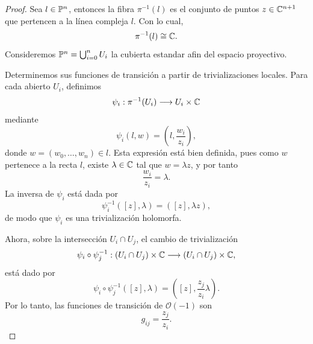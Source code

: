 	\begin{proof}
		Sea $l\in\mathbb{P}^n$, entonces la fibra $\pi^{-1}(l)$ es el conjunto de puntos $z\in\mathbb{C}^{n+1}$ que pertencen a la línea compleja $l$. Con lo cual,
		\begin{equation*}
			\pi^{-1}(l)\cong \mathbb{C}.
		\end{equation*}
		Consideremos $\mathbb{P}^n=\bigcup_{i=0}^n U_i$ la cubierta estandar afin del espacio proyectivo. 
		
		Determinemos sus funciones de transición a partir de trivializaciones locales. Para cada abierto $U_i$, definimos
		\begin{equation*}
			\psi_i:\pi^{-1}(U_i)\longrightarrow U_i\times \mathbb{C}
		\end{equation*}
		mediante
		\begin{equation*}
			\psi_i(l,w)=
			\left(
			l,
			\frac{w_i}{z_i}
			\right),
		\end{equation*}
		donde $w=(w_0,\dots,w_n)\in l$. Esta expresión está bien definida, pues como $w$ pertenece a la recta $l$, existe $\lambda\in\mathbb{C}$ tal que $w=\lambda z$, y por tanto
		\begin{equation*}
			\frac{w_i}{z_i}=\lambda.
		\end{equation*}
		La inversa de $\psi_i$ está dada por
		\begin{equation*}
			\psi_i^{-1}([z],\lambda)=([z],\lambda z),
		\end{equation*}
		de modo que $\psi_i$ es una trivialización holomorfa.
		
		Ahora, sobre la intersección $U_i\cap U_j$, el cambio de trivialización
		\begin{equation*}
			\psi_i\circ \psi_j^{-1}:
			(U_i\cap U_j)\times\mathbb{C}
			\longrightarrow
			(U_i\cap U_j)\times\mathbb{C},
		\end{equation*}
		está dado por
		\begin{equation*}
			\psi_i\circ \psi_j^{-1}([z],\lambda)
			=\left([z],\frac{z_j}{z_i}\lambda \right).
		\end{equation*}
		Por lo tanto, las funciones de transición de $\mathcal{O}(-1)$ son
		\begin{equation*}
			g_{ij}=\frac{z_j}{z_i}.
		\end{equation*}
	\end{proof}
	
